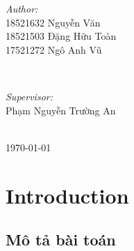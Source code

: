 \documentclass{article}
\begin{document}
\begin{titlepage}
 

\begin{minipage}{0.4\textwidth}
\begin{flushleft} \large
\emph{Author:}\\
18521632 Nguyễn Văn\\
18521503 Đặng Hữu Toàn\\ 
17521272 Ngô Anh Vũ
\end{flushleft}
\end{minipage}
~
\begin{minipage}{0.4\textwidth}
\begin{flushright} \large
\emph{Supervisor:} \\
Phạm Nguyễn Trường An %
\end{flushright}
\end{minipage}\\[5cm]



{\large \today}\\[2cm] %



\vfill %
\end{titlepage}


\fontsize{11}{24}\selectfont\tableofcontents


\newpage
\renewcommand\thesection{\Roman{section}}
\section{\fontsize{20}{20}\selectfont Introduction}

\fontsize{16}{16}\selectfont
    \subsection{ \fontsize{16}{16}\selectfont\textbf{Mô tả bài toán } }
    
\end{document}

